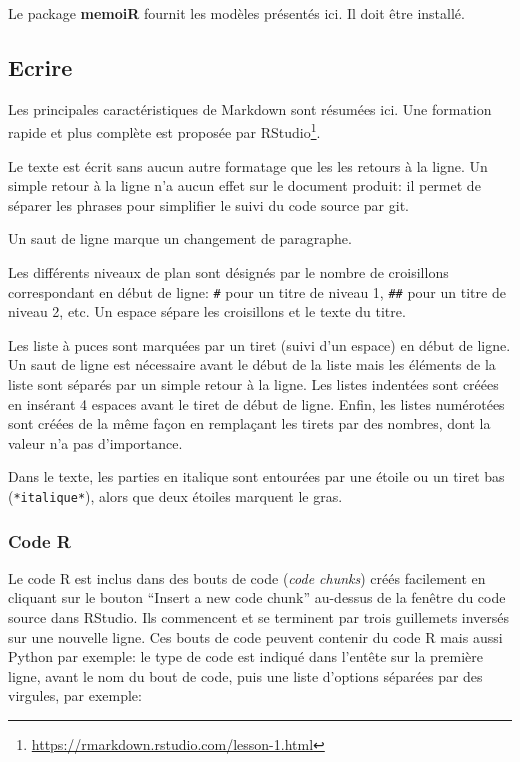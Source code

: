 \documentclass[
  12pt,
  french,
  a4paper,
  extrafontsizes,onecolumn,openright
  ]{memoir}
\begin{document}
Le package \textbf{memoiR} fournit les modèles présentés ici.
Il doit être installé.

\hypertarget{ecrire}{%
\subsection{Ecrire}\label{ecrire}}

Les principales caractéristiques de Markdown sont résumées ici.
Une formation rapide et plus complète est proposée par RStudio\footnote{\url{https://rmarkdown.rstudio.com/lesson-1.html}}.

Le texte est écrit sans aucun autre formatage que les les retours à la ligne.
Un simple retour à la ligne n'a aucun effet sur le document produit: il permet de séparer les phrases pour simplifier le suivi du code source par git.

Un saut de ligne marque un changement de paragraphe.

Les différents niveaux de plan sont désignés par le nombre de croisillons correspondant en début de ligne: \texttt{\#} pour un titre de niveau 1, \texttt{\#\#} pour un titre de niveau 2, etc.
Un espace sépare les croisillons et le texte du titre.

Les liste à puces sont marquées par un tiret (suivi d'un espace) en début de ligne.
Un saut de ligne est nécessaire avant le début de la liste mais les éléments de la liste sont séparés par un simple retour à la ligne.
Les listes indentées sont créées en insérant 4 espaces avant le tiret de début de ligne.
Enfin, les listes numérotées sont créées de la même façon en remplaçant les tirets par des nombres, dont la valeur n'a pas d'importance.

Dans le texte, les parties en italique sont entourées par une étoile ou un tiret bas (\texttt{*italique*}), alors que deux étoiles marquent le gras.

\hypertarget{code-r}{%
\subsubsection{Code R}\label{code-r}}

Le code R est inclus dans des bouts de code (\emph{code chunks}) créés facilement en cliquant sur le bouton \enquote{Insert a new code chunk} au-dessus de la fenêtre du code source dans RStudio.
Ils commencent et se terminent par trois guillemets inversés sur une nouvelle ligne.
Ces bouts de code peuvent contenir du code R mais aussi Python par exemple: le type de code est indiqué dans l'entête sur la première ligne, avant le nom du bout de code, puis une liste d'options séparées par des virgules, par exemple:
\end{document}
